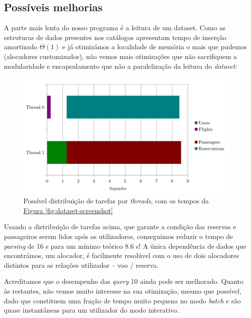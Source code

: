 \documentclass[12pt, a4paper]{article}
\begin{document}

\subsection{Possíveis melhorias}
\label{sec:possible-performance-improvements}

A parte mais lenta do nosso programa é a leitura de um dataset. Como as estruturas de dados
presentes nos catálogos apresentam tempo de inserção amortizado $\Theta(1)$ e já otimizámos a
localidade de memória o mais que pudemos (alocadores customizados), não vemos mais otimizações que
não sacrifiquem a modularidade e encapsulamento que não a paralelização da leitura do
\emph{dataset}:

\begin{figure}[h]
    \centering
    \includegraphics[scale=0.20]{res-fase2/threading.png}
    \caption{Possível distribuição de tarefas por \emph{threads}, com os tempos da
             \hyperref[fig:dataset-screenshot]{Figura \ref*{fig:dataset-screenshot}}}
    \label{fig:threading}
\end{figure}

Usando a distribuição de tarefas acima, que garante a condição das reservas e passageiros serem
lidos após os utilizadores, conseguimos reduzir o tempo de \emph{parsing} de 16 s para um mínimo
teórico 8.6 s! A única dependência de dados que encontrámos, um alocador, é facilmente resolúvel
com o uso de dois alocadores distintos para as relações utilizador -- voo / reserva.

Acreditamos que o desempenho das \emph{query} 10 ainda pode ser melhorado. Quanto às restantes,
não vemos muito interesse na sua otimização, mesmo que possível, dado que constituem uma fração de
tempo muito pequena no modo \emph{batch} e são quase instantâneas para um utilizador do modo
interativo.
\end{document}

